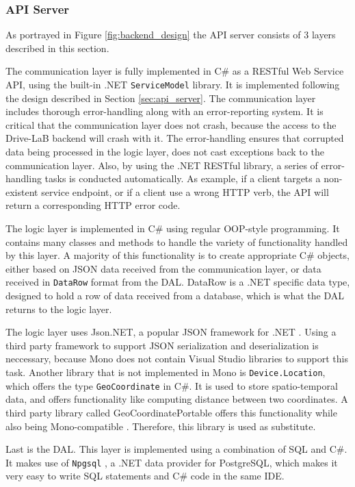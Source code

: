 \subsubsection{API Server}\label{subsec:impl_api_server}
As portrayed in Figure \ref{fig:backend_design} the API server consists of 3 layers described in this section.

The communication layer is fully implemented in C\# as a RESTful Web Service API, using the built-in .NET \texttt{ServiceModel} library. It is implemented following the design described in Section \ref{sec:api_server}. The communication layer includes thorough error-handling along with an error-reporting system. It is critical that the communication layer does not crash, because the access to the Drive-LaB backend will crash with it. The error-handling ensures that corrupted data being processed in the logic layer, does not cast exceptions back to the communication layer. Also, by using the .NET RESTful library, a series of error-handling tasks is conducted automatically. As example, if a client targets a non-existent service endpoint, or if a client use a wrong HTTP verb, the API will return a corresponding HTTP error code.

The logic layer is implemented in C\# using regular OOP-style programming. It contains many classes and methods to handle the variety of functionality handled by this layer. A majority of this functionality is to create appropriate C\# objects, either based on JSON data received from the communication layer, or data received in \texttt{DataRow} format from the DAL. DataRow is a .NET specific data type, designed to hold a row of data received from a database, which is what the DAL returns to the logic layer.  

The logic layer uses Json.NET, a popular JSON framework for .NET \citep{json_dot_net}. Using a third party framework to support JSON serialization and deserialization is neccessary, because Mono does not contain Visual Studio libraries to support this task. Another library that is not implemented in Mono is \texttt{Device.Location}, which offers the type \texttt{GeoCoordinate} in C\#. It is used to store spatio-temporal data, and offers functionality like computing distance between two coordinates. A third party library called GeoCoordinatePortable offers this functionality while also being Mono-compatible \citep{geocoordinateportable}. Therefore, this library is used as substitute.

Last is the DAL. This layer is implemented using a combination of SQL and C\#. It makes use of \texttt{Npgsql} \citep{npgsql}, a .NET data provider for PostgreSQL, which makes it very easy to write SQL statements and C\# code in the same IDE. 